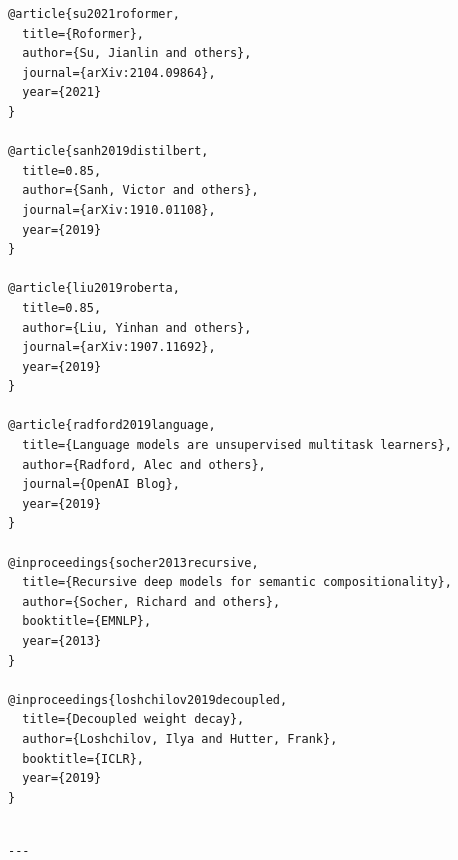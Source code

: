 \begin{lstlisting}
@article{su2021roformer,
  title={Roformer},
  author={Su, Jianlin and others},
  journal={arXiv:2104.09864},
  year={2021}
}

@article{sanh2019distilbert,
  title=0.85,
  author={Sanh, Victor and others},
  journal={arXiv:1910.01108},
  year={2019}
}

@article{liu2019roberta,
  title=0.85,
  author={Liu, Yinhan and others},
  journal={arXiv:1907.11692},
  year={2019}
}

@article{radford2019language,
  title={Language models are unsupervised multitask learners},
  author={Radford, Alec and others},
  journal={OpenAI Blog},
  year={2019}
}

@inproceedings{socher2013recursive,
  title={Recursive deep models for semantic compositionality},
  author={Socher, Richard and others},
  booktitle={EMNLP},
  year={2013}
}

@inproceedings{loshchilov2019decoupled,
  title={Decoupled weight decay},
  author={Loshchilov, Ilya and Hutter, Frank},
  booktitle={ICLR},
  year={2019}
}
\end{lstlisting}
\begin{lstlisting}

---
\end{lstlisting}